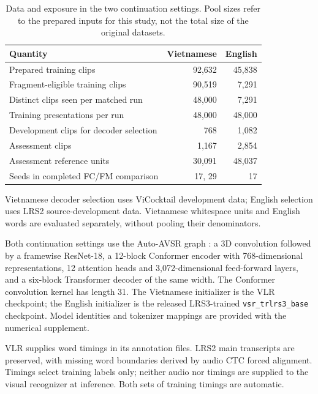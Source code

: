 \begin{table}[tbp]
\centering\small
\caption{Data and exposure in the two continuation settings. Pool sizes refer to
the prepared inputs for this study, not the total size of the original datasets.}
\label{tab:data}
\begin{tabular}{lrr}
\toprule
Quantity & Vietnamese & English\\
\midrule
Prepared training clips & 92,632 & 45,838\\
Fragment-eligible training clips & 90,519 & 7,291\\
Distinct clips seen per matched run & 48,000 & 7,291\\
Training presentations per run & 48,000 & 48,000\\
Development clips for decoder selection & 768 & 1,082\\
Assessment clips & 1,167 & 2,854\\
Assessment reference units & 30,091 & 48,037\\
Seeds in completed FC/FM comparison & 17, 29 & 17\\
\bottomrule
\end{tabular}
\par\smallskip\begin{minipage}{\linewidth}\footnotesize
Vietnamese decoder selection uses ViCocktail development data; English selection
uses LRS2 source-development data. Vietnamese whitespace units and English words
are evaluated separately, without pooling their denominators.
\end{minipage}
\end{table}

Both continuation settings use the Auto-AVSR graph \cite{ma2023autoavsr}: a
3D convolution followed by a framewise ResNet-18, a 12-block Conformer encoder
with 768-dimensional representations, 12 attention heads and 3,072-dimensional
feed-forward layers, and a six-block Transformer decoder of the same width.
The Conformer convolution kernel has length 31. The Vietnamese initializer is
the VLR checkpoint; the English initializer is the released LRS3-trained
\texttt{vsr\_trlrs3\_base} checkpoint. Model identities and tokenizer mappings
are provided with the numerical supplement.

VLR supplies word timings in its annotation files. LRS2 main transcripts are
preserved, with missing word boundaries derived by audio CTC forced alignment.
Timings select training labels only; neither audio nor timings are supplied to
the visual recognizer at inference. Both sets of training timings are automatic.


